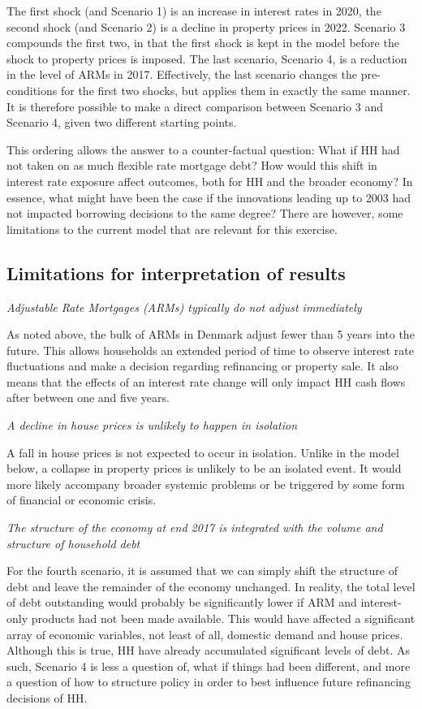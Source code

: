 \documentclass[
]{book}
\begin{document}
The first shock (and Scenario 1) is an increase in interest rates in 2020, the second shock (and Scenario 2) is a decline in property prices in 2022. Scenario 3 compounds the first two, in that the first shock is kept in the model before the shock to property prices is imposed. The last scenario, Scenario 4, is a reduction in the level of ARMs in 2017. Effectively, the last scenario changes the pre-conditions for the first two shocks, but applies them in exactly the same manner. It is therefore possible to make a direct comparison between Scenario 3 and Scenario 4, given two different starting points.

This ordering allows the answer to a counter-factual question: What if HH had not taken on as much flexible rate mortgage debt? How would this shift in interest rate exposure affect outcomes, both for HH and the broader economy? In essence, what might have been the case if the innovations leading up to 2003 had not impacted borrowing decisions to the same degree? There are however, some limitations to the current model that are relevant for this exercise.

\hypertarget{sec:fi-fl-sfc-scenarios-limitations}{%
\subsection{Limitations for interpretation of results}\label{sec:fi-fl-sfc-scenarios-limitations}}

\emph{Adjustable Rate Mortgages (ARMs) typically do not adjust immediately}

As noted above, the bulk of ARMs in Denmark adjust fewer than 5 years into the future. This allows households an extended period of time to observe interest rate fluctuations and make a decision regarding refinancing or property sale. It also means that the effects of an interest rate change will only impact HH cash flows after between one and five years.

\emph{A decline in house prices is unlikely to happen in isolation}

A fall in house prices is not expected to occur in isolation. Unlike in the model below, a collapse in property prices is unlikely to be an isolated event. It would more likely accompany broader systemic problems or be triggered by some form of financial or economic crisis.

\emph{The structure of the economy at end 2017 is integrated with the volume and structure of household debt}

For the fourth scenario, it is assumed that we can simply shift the structure of debt and leave the remainder of the economy unchanged. In reality, the total level of debt outstanding would probably be significantly lower if ARM and interest-only products had not been made available. This would have affected a significant array of economic variables, not least of all, domestic demand and house prices. Although this is true, HH have already accumulated significant levels of debt. As such, Scenario 4 is less a question of, what if things had been different, and more a question of how to structure policy in order to best influence future refinancing decisions of HH.
\end{document}
